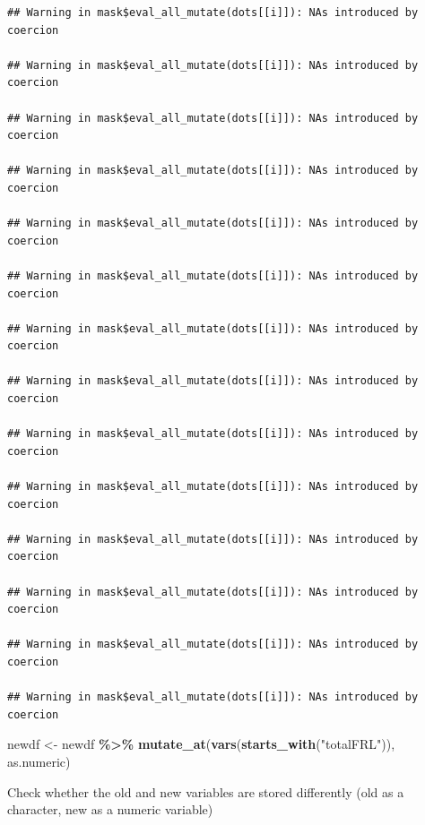 \documentclass[
]{book}
\newenvironment{Shaded}{\begin{snugshade}}{\end{snugshade}}
\newcommand{\DecValTok}[1]{\textcolor[rgb]{0.00,0.00,0.81}{#1}}
\newcommand{\KeywordTok}[1]{\textcolor[rgb]{0.13,0.29,0.53}{\textbf{#1}}}
\newcommand{\NormalTok}[1]{#1}
\newcommand{\OperatorTok}[1]{\textcolor[rgb]{0.81,0.36,0.00}{\textbf{#1}}}
\newcommand{\StringTok}[1]{\textcolor[rgb]{0.31,0.60,0.02}{#1}}
\begin{document}
\begin{verbatim}
## Warning in mask$eval_all_mutate(dots[[i]]): NAs introduced by coercion

## Warning in mask$eval_all_mutate(dots[[i]]): NAs introduced by coercion

## Warning in mask$eval_all_mutate(dots[[i]]): NAs introduced by coercion

## Warning in mask$eval_all_mutate(dots[[i]]): NAs introduced by coercion

## Warning in mask$eval_all_mutate(dots[[i]]): NAs introduced by coercion

## Warning in mask$eval_all_mutate(dots[[i]]): NAs introduced by coercion

## Warning in mask$eval_all_mutate(dots[[i]]): NAs introduced by coercion

## Warning in mask$eval_all_mutate(dots[[i]]): NAs introduced by coercion

## Warning in mask$eval_all_mutate(dots[[i]]): NAs introduced by coercion

## Warning in mask$eval_all_mutate(dots[[i]]): NAs introduced by coercion

## Warning in mask$eval_all_mutate(dots[[i]]): NAs introduced by coercion

## Warning in mask$eval_all_mutate(dots[[i]]): NAs introduced by coercion

## Warning in mask$eval_all_mutate(dots[[i]]): NAs introduced by coercion

## Warning in mask$eval_all_mutate(dots[[i]]): NAs introduced by coercion
\end{verbatim}

\begin{Shaded}
\begin{Highlighting}[]
\NormalTok{newdf \textless{}{-}}\StringTok{ }\NormalTok{newdf }\OperatorTok{\%\textgreater{}\%}\StringTok{ }
\StringTok{  }\KeywordTok{mutate\_at}\NormalTok{(}\KeywordTok{vars}\NormalTok{(}\KeywordTok{starts\_with}\NormalTok{(}\StringTok{"totalFRL"}\NormalTok{)), as.numeric)}
\end{Highlighting}
\end{Shaded}

Check whether the old and new variables are stored differently (old as a character, new as a numeric variable)

\begin{Shaded}
\end{Shaded}
\end{document}
